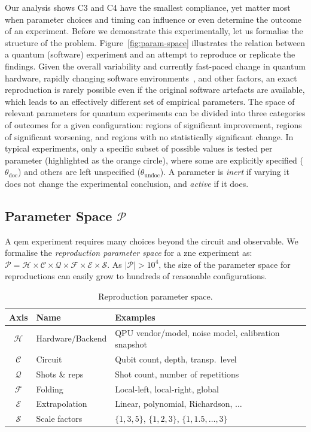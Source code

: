 \documentclass[10pt,conference]{IEEEtran}
\begin{document}
Our analysis shows C3 and C4 have the smallest compliance, yet matter most when parameter choices and timing can influence or even determine the outcome of an experiment. Before we demonstrate this experimentally, let us formalise the structure of the problem. Figure~\ref{fig:param-space} illustrates the relation between a quantum (software) experiment and an attempt to reproduce or replicate the findings. Given the overall variability and currently fast-paced change in quantum hardware, rapidly changing software environments~\cite{carbonelli_challenges_2024,gierisch_qef_2026,qiskit2024}, and other factors, an exact reproduction is rarely possible even if the original software artefacts are available, which leads to an effectively different set of empirical parameters. The space of relevant parameters for quantum experiments can be divided into three categories of outcomes for a given configuration: regions of significant improvement, regions of significant worsening, and regions with no statistically significant change. In typical experiments, only a specific subset of possible values is tested per parameter (highlighted as the orange circle), where some are explicitly specified ($\theta_\text{doc}$) and others are left unspecified ($\theta_\text{undoc}$). A parameter is \emph{inert} if varying it does not change the experimental conclusion, and \emph{active} if it does. 

\subsection{Parameter Space $\mathcal{P}$}
A \gls{qem} experiment requires many choices beyond the circuit and observable.
We formalise the \emph{reproduction parameter space} for a \gls{zne} experiment as:
\( \mathcal{P} = \mathcal{H} \times \mathcal{C} \times \mathcal{Q} \times \mathcal{F} \times \mathcal{E} \times \mathcal{S}\).
As $|\mathcal{P}| > 10^{4}$, the size of the parameter space for reproductions can easily grow to hundreds of reasonable configurations.

\begin{table}[htbp]
  \centering
  \caption{Reproduction parameter space.}
  \label{tab:param-space}
  \small
  \begin{tabular}{@{}clp{4.6cm}@{}}
    \toprule
    \textbf{Axis} & \textbf{Name} & \textbf{Examples} \\
    \midrule
    $\mathcal{H}$ & Hardware/Backend & QPU vendor/model, noise model, calibration snapshot \\
    $\mathcal{C}$ & Circuit & Qubit count, depth, transp.~level \\
    $\mathcal{Q}$ & Shots \& reps & Shot count, number of repetitions \\
    $\mathcal{F}$ & Folding & Local-left, local-right, global \\
    $\mathcal{E}$ & Extrapolation & Linear, polynomial, Richardson, $\ldots$\\
    $\mathcal{S}$ & Scale factors & $\{1,3,5\}$, $\{1,2,3\}$, $\{1,1.5,\ldots,3\}$ \\
    \bottomrule
  \end{tabular}
\end{table}
\end{document}

